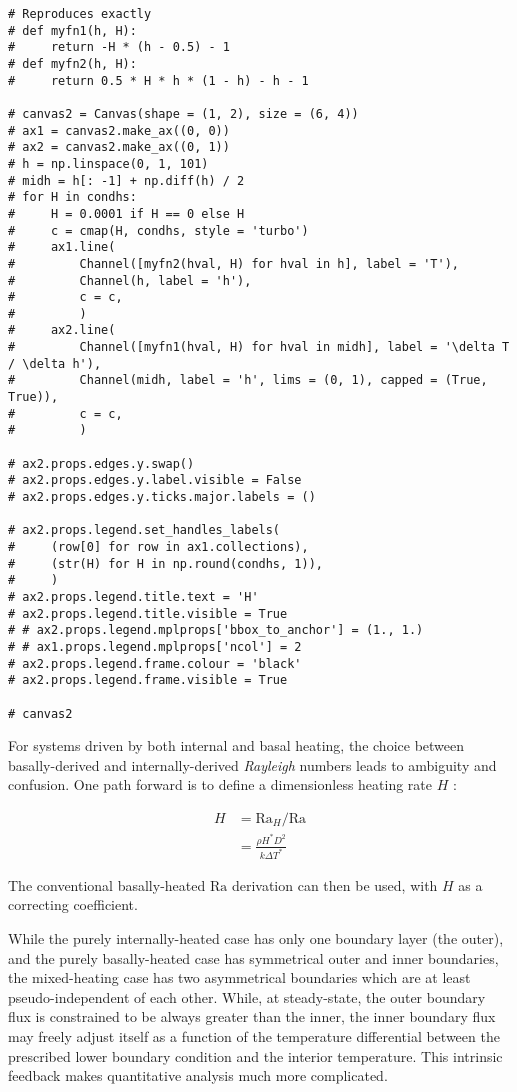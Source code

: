 \begin{verbatim}
# Reproduces exactly
# def myfn1(h, H):
#     return -H * (h - 0.5) - 1
# def myfn2(h, H):
#     return 0.5 * H * h * (1 - h) - h - 1

# canvas2 = Canvas(shape = (1, 2), size = (6, 4))
# ax1 = canvas2.make_ax((0, 0))
# ax2 = canvas2.make_ax((0, 1))
# h = np.linspace(0, 1, 101)
# midh = h[: -1] + np.diff(h) / 2
# for H in condhs:
#     H = 0.0001 if H == 0 else H
#     c = cmap(H, condhs, style = 'turbo')
#     ax1.line(
#         Channel([myfn2(hval, H) for hval in h], label = 'T'),
#         Channel(h, label = 'h'),
#         c = c,
#         )
#     ax2.line(
#         Channel([myfn1(hval, H) for hval in midh], label = '\delta T / \delta h'),
#         Channel(midh, label = 'h', lims = (0, 1), capped = (True, True)),
#         c = c,
#         )

# ax2.props.edges.y.swap()
# ax2.props.edges.y.label.visible = False
# ax2.props.edges.y.ticks.major.labels = ()

# ax2.props.legend.set_handles_labels(
#     (row[0] for row in ax1.collections),
#     (str(H) for H in np.round(condhs, 1)),
#     )
# ax2.props.legend.title.text = 'H'
# ax2.props.legend.title.visible = True
# # ax2.props.legend.mplprops['bbox_to_anchor'] = (1., 1.)
# # ax1.props.legend.mplprops['ncol'] = 2
# ax2.props.legend.frame.colour = 'black'
# ax2.props.legend.frame.visible = True

# canvas2
\end{verbatim}

For systems driven by both internal and basal heating, the choice between basally-derived and internally-derived \textit{Rayleigh} numbers leads to ambiguity and confusion. One path forward is to define a dimensionless heating rate $H$ \cite{Schubert2001-ea}:

\begin{align*}
H &= {\mathrm{Ra}}_H / \mathrm{Ra} \\
&= \frac{\rho H^{*} D^2}{k {\Delta T}^{*}}
\end{align*}

The conventional basally-heated $\mathrm{Ra}$ derivation can then be used, with $H$ as a correcting coefficient.

While the purely internally-heated case has only one boundary layer (the outer), and the purely basally-heated case has symmetrical outer and inner boundaries, the mixed-heating case has two asymmetrical boundaries which are at least pseudo-independent of each other. While, at steady-state, the outer boundary flux is constrained to be always greater than the inner, the inner boundary flux may freely adjust itself as a function of the temperature differential between the prescribed lower boundary condition and the interior temperature. This intrinsic feedback makes quantitative analysis much more complicated.

